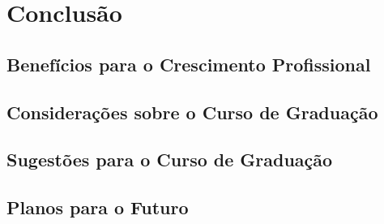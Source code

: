 \chapter{Conclusão}
\label{ch:conclusao}

\section{Benefícios para o Crescimento Profissional}



\section{Considerações sobre o Curso de Graduação}



\section{Sugestões para o Curso de Graduação}



\section{Planos para o Futuro}


